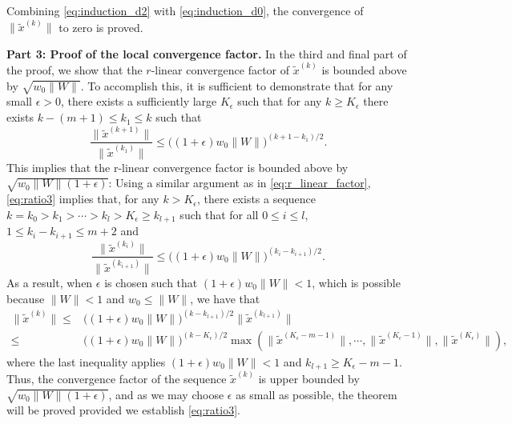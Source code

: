 \documentclass[11pt]{article}
\begin{document}
{{Combining \eqref{eq:induction_d2} with \eqref{eq:induction_d0}, the convergence of $\|\widetilde{x}^{(k)}\|$ to zero is proved.%
\vspace{0.1in}

\textbf{Part 3: Proof of the local convergence factor.} {In the third and final part of the proof, we show that the $r$-linear convergence factor of $\widetilde{x}^{(k)}$ is bounded above by $\sqrt{w_0\|W\|}$.} 
To accomplish this, it is sufficient to demonstrate that for any small $\epsilon>0$, there exists a sufficiently large $K_\epsilon$ such that for any $k\geq K_\epsilon$ there exists $k-(m+1)\leq k_1\leq k$ such that
\begin{equation}\label{eq:ratio3}
\frac{\|\widetilde{x}^{(k+1)}\|}{\|\widetilde{x}^{(k_1)}\|}\leq \Big((1+\epsilon)w_0\|W\|\Big)^{(k+1-k_1)/2}.
\end{equation}
This implies that the r-linear {convergence factor} is bounded above by $\sqrt{w_0\|W\|(1+\epsilon)}$: Using a similar argument as in \eqref{eq:r_linear_factor}, \eqref{eq:ratio3} implies that, for any $k>K_\epsilon$, there exists a sequence $k=k_0>k_1>\cdots>k_l> K_\epsilon\geq k_{l+1}$ such that for all $0\leq i\leq l$,  $1\leq k_i-k_{i+1}\leq m+2$ and 
\[
\frac{\|\widetilde{x}^{(k_i)}\|}{\|\widetilde{x}^{(k_{i+1})}\|}\leq \Big((1+\epsilon)w_0\|W\|\Big)^{(k_i-k_{i+1})/2}.
\]
As a result, when $\epsilon$ is chosen such that $(1+\epsilon)w_0\|W\|<1$, which is possible because $\|W\|<1$ and $w_0\leq \|W\|$, we have that
\begin{align*}
\|\widetilde{x}^{(k)}\| \leq& \Big((1+\epsilon)w_0 \|W\| \Big)^{(k-k_{l+1})/2}  
\|\widetilde{x}^{(k_{l+1})}\|\\
\leq& 
\Big( (1+\epsilon)w_0 \|W\| \Big)^{(k-K_\epsilon)/2 } \max\left(\|\widetilde{x}^{(K_\epsilon-m-1)}\|,\cdots,\|\widetilde{x}^{(K_\epsilon-1)}\|,\|\widetilde{x}^{(K_\epsilon)}\|  \right),
\end{align*}
where the last inequality applies $(1+\epsilon)w_0\|W\|<1$ and $k_{l+1}\geq K_{\epsilon}-m-1$.
Thus, the convergence factor of the sequence $\widetilde{x}^{(k)}$ is upper bounded by $\sqrt{w_0\|W\|(1+\epsilon)}$, and 
as we may choose $\epsilon$ as small as possible, the theorem will be proved provided we establish \eqref{eq:ratio3}. 

}}
\end{document}

